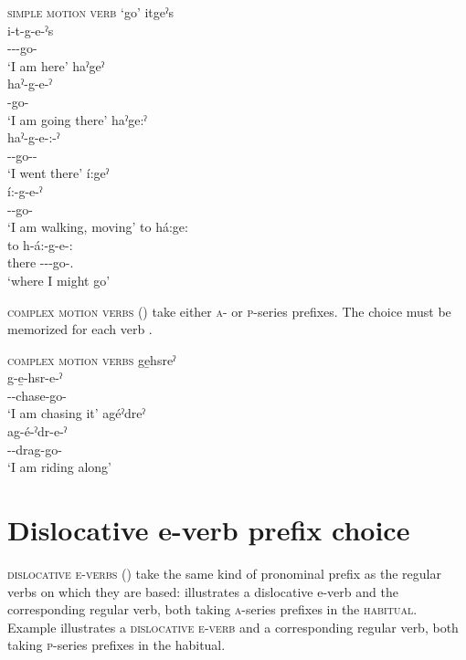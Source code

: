 \ea\label{ex:motionpronchoice1} \textsc{simple motion verb}  ‘go’
\ea itgeˀs\\
\gll i-t-g-e-ˀs\\
 {\prothetic}-{\cislocative}--go-{\habitual}\\
\glt `I am here'
\ex haˀgeˀ\\
\gll haˀ-g-e-ˀ\\
 {\translocativefactual}-go-{\punctual}\\
\glt `I am going there'
\ex haˀge:ˀ\\
\gll haˀ-g-e-:-ˀ\\
 {\translocativefactual}--go-{\purposive}-{\punctual}\\
\glt `I went there'
\ex í:geˀ\\
\gll í:-g-e-ˀ\\
 {\prothetic}--go-{\stative}\\
\glt `I am walking, moving'
\ex to há:ge:\\
\gll to h-á:-g-e-:\\
there {\translocative}-{\indefinite}--go-{\purposive}.{\noaspect}\\
\glt `where I might go'
\z
\z

\textsc{complex motion verbs} () take either \textsc{a}- or \textsc{p}-series prefixes. The choice must be memorized for each verb .

\ea\label{ex:motionpronchoice2} \textsc{complex motion verbs}
\ea ge̱hsreˀ\\
\gll g-e̱-hsr-e-ˀ\\
 -{\joinerE}-chase-go-{\stative}\\
\glt `I am chasing it'
\ex agéˀdreˀ\\
\gll ag-é-ˀdr-e-ˀ\\
 -{\joinerE}-drag-go-{\stative}\\
\glt `I am riding along'
\z
\z


\section{Dislocative e-verb prefix choice} \label{ch:Dislocative E-verb prefix choice}
\textsc{dislocative e-verbs} () take the same kind of pronominal prefix as the regular verbs on which they are based:  illustrates a dislocative e-verb and the corresponding regular verb, both taking \textsc{a}-series prefixes in the \textsc{habitual}. Example  illustrates a \textsc{dislocative e-verb} and a corresponding regular verb, both taking \textsc{p}-series prefixes in the habitual.

